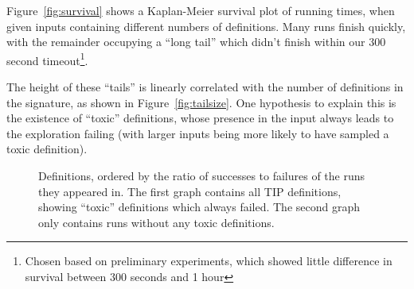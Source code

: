 Figure~\ref{fig:survival} shows a Kaplan-Meier survival plot of \quickspec{}
running times, when given inputs containing different numbers of definitions.
Many runs finish quickly, with the remainder occupying a ``long tail'' which
didn't finish within our 300 second timeout\footnote{Chosen based on preliminary
  experiments, which showed little difference in survival between 300 seconds
  and 1 hour}.

\iffalse
\begin{figure}
  \scalebox{0.45}{}
  \scalebox{0.45}{}
  \caption{Proportion of samples which timed out per size, with least-squares
    linear regression. First plot is for all TIP definitions, second removes
    runs given ``toxic'' definitions.}
  \label{fig:tailsize}
\end{figure}
\fi

The height of these ``tails'' is linearly correlated with the number of
definitions in the signature, as shown in Figure~\ref{fig:tailsize}. One
hypothesis to explain this is the existence of ``toxic'' definitions, whose
presence in the input always leads to the exploration failing (with larger
inputs being more likely to have sampled a toxic definition).

\begin{figure}
  \scalebox{0.45}{}
  \scalebox{0.45}{}
  \caption{Definitions, ordered by the ratio of successes to failures of the
    runs they appeared in. The first graph contains all TIP definitions, showing
    ``toxic'' definitions which always failed. The second graph only contains
    runs without any toxic definitions.
    \iffalse
    TODO: Alison: ? (ME: The green/red bar graphs appear as empty white boxes in
    the PDF Alison sent over. Check how it's rendered!)
    TODO: The x-axis ticks are crap (all overlapping); turn them off, put a
    single label like ``Definitions (ordered by failure rate)''
    \fi}
  \label{fig:proportions}
\end{figure}

